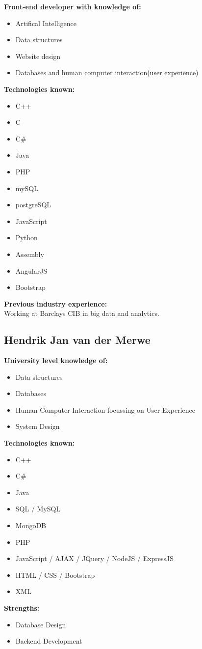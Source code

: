 \documentclass{article}
\begin{document}
\textbf{Front-end developer with knowledge of:}
\begin{itemize}
 	\item Artifical Intelligence
 	\item Data structures 
 	\item Website design 
 	\item Databases and human computer interaction(user experience)
 \end{itemize}
\textbf{Technologies known:}
\begin{itemize}
	\item C++ 
	\item C 
	\item C\# 
	\item Java 
	\item PHP
	\item mySQL
	\item postgreSQL
	\item JavaScript 
	\item Python 
	\item Assembly 
	\item AngularJS  
	\item Bootstrap
 \end{itemize}
\textbf{Previous industry experience:}\\
Working at Barclays CIB in big data and analytics.
\\
\newpage
\subsection {Hendrik Jan van der Merwe} 
\textbf{University level knowledge of:}
\begin{itemize}
 	\item Data structures
 	\item Databases
 	\item Human Computer Interaction focussing on User Experience
 	\item System Design
\end{itemize}
\textbf{Technologies known:}
\begin{itemize}
	\item C++
	\item C\#
	\item Java
	\item SQL / MySQL
	\item MongoDB
	\item PHP
	\item JavaScript / AJAX / JQuery / NodeJS / ExpressJS
	\item HTML / CSS / Bootstrap
	\item XML
\end{itemize}
\textbf{Strengths:}
\begin{itemize}
	\item Database Design
	\item Backend Development
\end{itemize}
\end{document}
